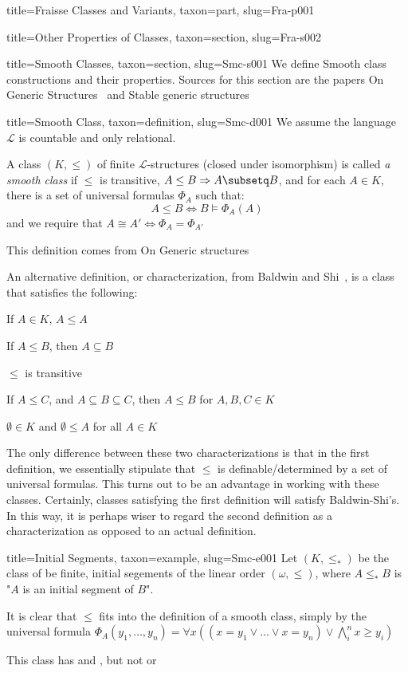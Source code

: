 \documentclass[a4paper]{article}
\begin{document}
\begin{tree}{title={Fraisse Classes and Variants}, taxon={part}, slug={Fra-p001}}
\begin{tree}{title={Other Properties of Classes}, taxon={section}, slug={Fra-s002}}
\end{tree}

\begin{tree}{title={Smooth Classes}, taxon={section}, slug={Smc-s001}}
We define Smooth class constructions and their properties. Sources for this section are the papers On Generic Structures~\cite{Smc-r001} and Stable generic structures~\cite{Smc-r002}
\begin{tree}{title={Smooth Class}, taxon={definition}, slug={Smc-d001}}
We assume the language \(\mathcal {L}\) is countable and only relational.\par{A class \((K, \leq )\) of finite \(\mathcal {L}\)-structures (closed under isomorphism) is called \emph{a smooth class} if \(\leq\) is transitive, \(A \leq  B  \Rightarrow  A \subsetq  B\), and for each \(A \in  K\), there is a set of universal formulas \(\Phi _A\) such that:
\[A \leq  B  \Leftrightarrow  B \models   \Phi _A(A)\]
and we require that \(A \cong  A'  \Leftrightarrow   \Phi _A =  \Phi _{A'}\)}\par{This definition comes from On Generic structures~\cite{Smc-r001}}\par{An alternative definition, or characterization, from Baldwin and Shi~\cite{Smc-r002}, is a class that satisfies the following:}\par{If \(A \in  K\), \(A \leq  A\)}\par{If \(A \leq  B\), then \(A \subseteq  B\)}\par{\(\leq\) is transitive}\par{If \(A \leq  C\), and \(A \subseteq  B \subseteq  C\), then \(A \leq  B\) for \(A,B,C  \in  K\)}\par{\(\emptyset \in  K\) and \(\emptyset   \leq  A\) for all \(A \in  K\)}\par{The only difference between these two characterizations is that in the first definition, we essentially stipulate that \(\leq\) is definable/determined by a 
set of universal formulas. This turns out to be an advantage in working with these classes. Certainly, classes satisfying the first definition will satisfy Baldwin-Shi's. In this way,
it is perhaps wiser to regard the second definition as a characterization as opposed to an actual definition.}
\end{tree}

\begin{tree}{title={Initial Segments}, taxon={example}, slug={Smc-e001}}
 Let \((K, \leq _*)\) be the class of be finite, initial segements of the linear order \(( \omega , \leq )\), where \(A \leq _* B\) is "\(A\) is an initial segment of \(B\)".\par{It is clear that \(\leq\) fits into the definition of a smooth class, simply by the universal formula \(\Phi _A(y_1, \dots , y_n) =  \forall  x(( x=y_1 \lor \dots \lor  x=y_n)  \lor   \bigwedge _i^n x \geq  y_i)\)}\par{This class has  and , but not  or }
\end{tree}


\end{tree}
\end{tree}
\end{document}
